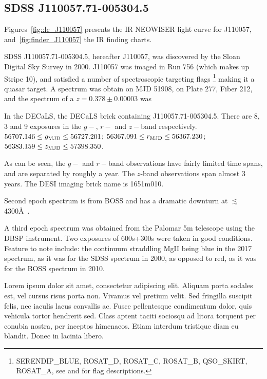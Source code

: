 \documentclass[apj]{emulateapj}
\begin{document}
\subsection{SDSS J110057.71-005304.5}
Figures~\ref{fig::lc_J110057} presents the IR NEOWISER light curve for 
J110057, and~\ref{fig:finder_J110057} the IR finding charts. 

SDSS J110057.71-005304.5, hereafter J110057, was discovered by 
the Sloan Digital Sky Survey in 2000. 
 J110057 was imaged in Run 756 (which makes up Stripe 10), 
and satisfied a number of spectroscopic targeting flags
\footnote{SERENDIP\_BLUE, ROSAT\_D,  ROSAT\_C,  ROSAT\_B, QSO\_SKIRT, ROSAT\_A, 
see \citet{EDR} and \citet{Richards02} for flag descriptions.}
making it a quasar target. A spectrum was obtain on MJD 51908, on Plate 
277, Fiber 212, and the spectrum of a $z=0.378\pm0.00003$ was

In the DECaLS, the DECaLS brick containing J110057.71-005304.5.
There are 8, 3 and 9 exposures in the $g-$, $r-$ and $z-$band 
respectively. 
$56707.146 \leq g_{\rm MJD} \leq  56727.201$;  
$56367.091 \leq  r_{\rm MJD} \leq  56367.230$; 
$56383.159 \leq  z_{\rm MJD} \leq  57398.350$. 

As can be seen, the $g-$ and $r-$band observations have fairly limited
time spans, and are separated by roughly a year. The $z$-band
observations span almost 3 years.  The DESI imaging brick name is
1651m010.

Second epoch spectrum is from BOSS and has a dramatic downturn at 
$\lesssim$4300\AA\ . 

A third epoch spectrum was obtained from the Palomar 5m 
telescope using the DBSP instrument. 
Two exposures of 600s+300s were taken in good conditions. 
Feature to note include: the continuum straddling MgII
being blue in the 2017 spectrum, as it was for the SDSS spectrum in 2000, as opposed to
red, as it was for the BOSS spectrum in 2010.  

Lorem ipsum dolor sit amet, consectetur adipiscing elit. Aliquam porta
sodales est, vel cursus risus porta non. Vivamus vel pretium
velit. Sed fringilla suscipit felis, nec iaculis lacus convallis
ac. Fusce pellentesque condimentum dolor, quis vehicula tortor
hendrerit sed. Class aptent taciti sociosqu ad litora torquent per
conubia nostra, per inceptos himenaeos. Etiam interdum tristique diam
eu blandit. Donec in lacinia libero.
\end{document}
